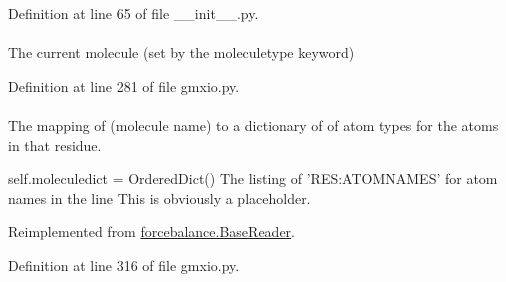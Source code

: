 \-Definition at line 65 of file \-\_\-\-\_\-init\-\_\-\-\_\-.\-py.

\hypertarget{classforcebalance_1_1gmxio_1_1ITP__Reader_a4bfd13e4b79e0d89f0263d1f2e566850}{
\paragraph[{mol}]{}}\label{classforcebalance_1_1gmxio_1_1ITP__Reader_a4bfd13e4b79e0d89f0263d1f2e566850}


\-The current molecule (set by the moleculetype keyword) 



\-Definition at line 281 of file gmxio.\-py.

\hypertarget{classforcebalance_1_1gmxio_1_1ITP__Reader_a5ed800499e9442adaea0cee243960f94}{
\paragraph[{molatom}]{}}\label{classforcebalance_1_1gmxio_1_1ITP__Reader_a5ed800499e9442adaea0cee243960f94}


\-The mapping of (molecule name) to a dictionary of of atom types for the atoms in that residue. 

self.\-moleculedict = \-Ordered\-Dict() \-The listing of '\-R\-E\-S\-:\-A\-T\-O\-M\-N\-A\-M\-E\-S' for atom names in the line \-This is obviously a placeholder. 

\-Reimplemented from \hyperlink{classforcebalance_1_1BaseReader_ab444c213e15929253dd73395ac5f19fc}{forcebalance.\-Base\-Reader}.



\-Definition at line 316 of file gmxio.\-py.

\hypertarget{classforcebalance_1_1BaseReader_a4369b5fb663a83b11602daa71db6862e}{
\paragraph[{\-Molecules}]{}}\label{classforcebalance_1_1BaseReader_a4369b5fb663a83b11602daa71db6862e}


